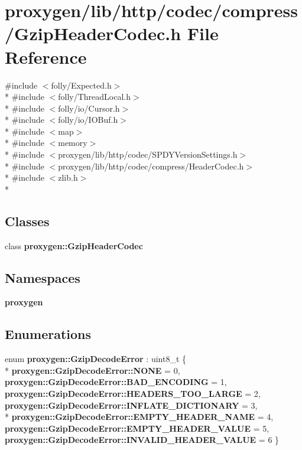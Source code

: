 \section{proxygen/lib/http/codec/compress/\+Gzip\+Header\+Codec.h File Reference}
\label{GzipHeaderCodec_8h}
{\ttfamily \#include $<$folly/\+Expected.\+h$>$}\\*
{\ttfamily \#include $<$folly/\+Thread\+Local.\+h$>$}\\*
{\ttfamily \#include $<$folly/io/\+Cursor.\+h$>$}\\*
{\ttfamily \#include $<$folly/io/\+I\+O\+Buf.\+h$>$}\\*
{\ttfamily \#include $<$map$>$}\\*
{\ttfamily \#include $<$memory$>$}\\*
{\ttfamily \#include $<$proxygen/lib/http/codec/\+S\+P\+D\+Y\+Version\+Settings.\+h$>$}\\*
{\ttfamily \#include $<$proxygen/lib/http/codec/compress/\+Header\+Codec.\+h$>$}\\*
{\ttfamily \#include $<$zlib.\+h$>$}\\*
\subsection*{Classes}
\begin{DoxyCompactItemize}
\item 
class {\bf proxygen\+::\+Gzip\+Header\+Codec}
\end{DoxyCompactItemize}
\subsection*{Namespaces}
\begin{DoxyCompactItemize}
\item 
 {\bf proxygen}
\end{DoxyCompactItemize}
\subsection*{Enumerations}
\begin{DoxyCompactItemize}
\item 
enum {\bf proxygen\+::\+Gzip\+Decode\+Error} \+: uint8\+\_\+t \{ \\*
{\bf proxygen\+::\+Gzip\+Decode\+Error\+::\+N\+O\+NE} = 0, 
{\bf proxygen\+::\+Gzip\+Decode\+Error\+::\+B\+A\+D\+\_\+\+E\+N\+C\+O\+D\+I\+NG} = 1, 
{\bf proxygen\+::\+Gzip\+Decode\+Error\+::\+H\+E\+A\+D\+E\+R\+S\+\_\+\+T\+O\+O\+\_\+\+L\+A\+R\+GE} = 2, 
{\bf proxygen\+::\+Gzip\+Decode\+Error\+::\+I\+N\+F\+L\+A\+T\+E\+\_\+\+D\+I\+C\+T\+I\+O\+N\+A\+RY} = 3, 
\\*
{\bf proxygen\+::\+Gzip\+Decode\+Error\+::\+E\+M\+P\+T\+Y\+\_\+\+H\+E\+A\+D\+E\+R\+\_\+\+N\+A\+ME} = 4, 
{\bf proxygen\+::\+Gzip\+Decode\+Error\+::\+E\+M\+P\+T\+Y\+\_\+\+H\+E\+A\+D\+E\+R\+\_\+\+V\+A\+L\+UE} = 5, 
{\bf proxygen\+::\+Gzip\+Decode\+Error\+::\+I\+N\+V\+A\+L\+I\+D\+\_\+\+H\+E\+A\+D\+E\+R\+\_\+\+V\+A\+L\+UE} = 6
 \}
\end{DoxyCompactItemize}
